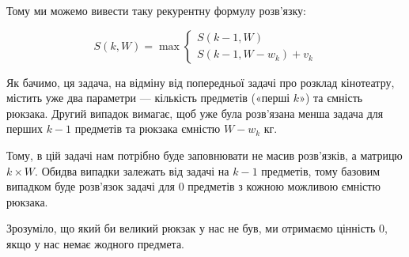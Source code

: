 \documentclass[12pt,a4paper]{report}
\begin{document}
Тому ми можемо вивести таку рекурентну формулу розв’язку:

\begin{equation*}
    S(k, W) = \max
    \begin{cases}
        S(k - 1, W) \\
        S(k - 1, W - w_k) + v_k
    \end{cases}
\end{equation*}

Як бачимо, ця задача, на відміну від попередньої задачі про розклад кінотеатру, містить уже два параметри --- кількість предметів («перші \(k\)») та ємність рюкзака. Другий випадок вимагає, щоб уже була розв’язана менша задача для перших \(k - 1\) предметів та рюкзака ємністю \(W - w_k\) кг.

Тому, в цій задачі нам потрібно буде заповнювати не масив розв’язків, а матрицю \(k \times W\). Обидва випадки залежать від задачі на \(k - 1\) предметів, тому базовим випадком буде розв’язок задачі для 0 предметів з кожною можливою ємністю рюкзака.

Зрозуміло, що який би великий рюкзак у нас не був, ми отримаємо цінність 0, якщо у нас немає жодного предмета.
\end{document}
